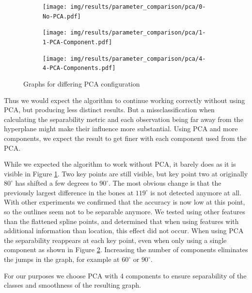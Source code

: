 \documentclass[pdftex,12pt,a4paper]{report}
\begin{document}
 \begin{figure}[h]
 	\centering
 	\begin{subfigure}[b]{0.32\textwidth}
 		\centering
 		\texttt{[image: img/results/parameter\_comparison/pca/0-No-PCA.pdf]}
 		\label{fig:pca-0}
 	\end{subfigure}
 	\begin{subfigure}[b]{0.32\textwidth}
 		\centering
 		\texttt{[image: img/results/parameter\_comparison/pca/1-1-PCA-Component.pdf]}
 		\label{fig:pca-1}
 	\end{subfigure}
 	\begin{subfigure}[b]{0.32\textwidth}
 		\centering
 		\texttt{[image: img/results/parameter\_comparison/pca/4-4-PCA-Components.pdf]}
 		\label{fig:pca-2}
 	\end{subfigure}
 	\caption{Graphs for differing PCA configuration}
 	\label{fig:pca}
 \end{figure}

Thus we would expect the algorithm to continue working correctly without using PCA, but producing less distinct results. But a missclassification when calculating the separability metric and each observation being far away from the hyperplane might make their influence more substantial. Using PCA and more components, we expect the result to get finer with each component used from the PCA.
 
While we expected the algorithm to work without PCA, it barely does as it is visible in Figure \ref{fig:pca-0}. Two key points are still visible, but key point two at originally $80^\circ$ has shifted a few degrees to $90^\circ$. The most obvious change is that the previously largest difference in the bones at $119^\circ$ is not detected anymore at all. With other experiments we confirmed that the accuracy is now low at this point, so the outlines seem not to be separable anymore. We tested using other features than the flattened spline points, and determined that when using features with additional information than location, this effect did not occur. When using PCA the separability reappears at each key point, even when only using a single component as shown in Figure \ref{fig:pca-1}. Increasing the number of components eliminates the jumps in the graph, for example at $60^\circ$ or $90^\circ$.

For our purposes we choose PCA with 4 components to ensure separability of the classes and smoothness of the resulting graph.
\end{document}
